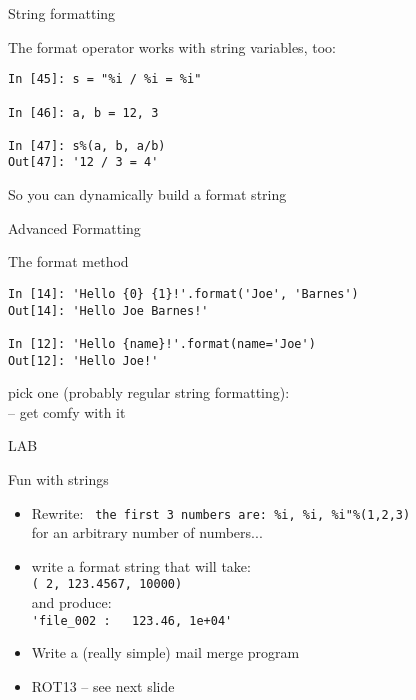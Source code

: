 \documentclass{beamer}
\begin{document}
\begin{frame}[fragile]{String formatting}

{\Large The format operator works with string variables, too:}

\begin{verbatim}
In [45]: s = "%i / %i = %i"

In [46]: a, b = 12, 3

In [47]: s%(a, b, a/b)
Out[47]: '12 / 3 = 4'
\end{verbatim}
\vfill
So you can dynamically build a format string
\end{frame}

\begin{frame}[fragile]{Advanced Formatting}

{\Large The format method}

\begin{verbatim}
In [14]: 'Hello {0} {1}!'.format('Joe', 'Barnes')
Out[14]: 'Hello Joe Barnes!'

In [12]: 'Hello {name}!'.format(name='Joe')
Out[12]: 'Hello Joe!'
\end{verbatim}
\vfill
{\Large pick one (probably regular string formatting): \\
  -- get comfy with it }

\end{frame}


\begin{frame}[fragile]{LAB}

{\Large Fun with strings}

\begin{itemize}
  \item Rewrite: \verb| the first 3 numbers are: %i, %i, %i"%(1,2,3)| \\
        for an arbitrary number of numbers...
  \item write a format string that will take:\\
        \verb|( 2, 123.4567, 10000)| \\
        and produce: \\
        \verb|'file_002 :   123.46, 1e+04'|
  \item Write a (really simple) mail merge program
  \item ROT13 -- see next slide
\end{itemize}

\end{frame}
\end{document}
